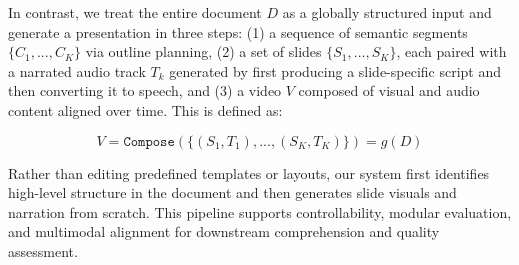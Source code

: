 \documentclass[11pt]{article}
\begin{document}
In contrast, we treat the entire document \( D \) as a globally structured input and generate a presentation in three steps: 
(1) a sequence of semantic segments \( \{C_1, ..., C_K\} \) via outline planning, 
(2) a set of slides \( \{S_1, ..., S_K\} \), each paired with a narrated audio track \( T_k \) generated by first producing a slide-specific script and then converting it to speech, and (3) a video \( V \) composed of visual and audio content aligned over time.  This is defined as:

\[
V = \texttt{Compose}(\{(S_1, T_1), ..., (S_K, T_K)\}) = g(D) \tag{2} \label{eq:ours}
\]

Rather than editing predefined templates or layouts, our system first identifies high-level structure in the document and then generates slide visuals and narration from scratch. This pipeline supports controllability, modular evaluation, and multimodal alignment for downstream comprehension and quality assessment.


\begin{table}[t]
\centering
{}
\caption{
Detailed evaluation results on the 5-document test set. Fact-based evaluation includes accuracy on five fixed quiz questions (Q1–Q5). Preference-based evaluation includes 1–5 scale scores for content fidelity, visual design, and overall clarity. Each Quality Score group has a calculated mean column.
}
\label{tab:detailed_eval}
\end{table}
\end{document}
